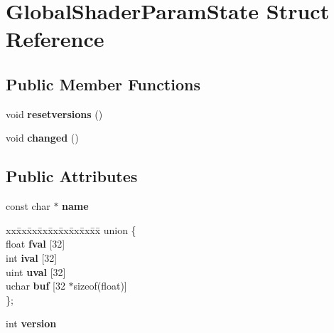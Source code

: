\hypertarget{struct_global_shader_param_state}{}\section{Global\+Shader\+Param\+State Struct Reference}
\label{struct_global_shader_param_state}
\subsection*{Public Member Functions}
\begin{DoxyCompactItemize}
\item 
\mbox{\label{struct_global_shader_param_state_ae241e9036d2ac52dc020baaab581c1eb}} 
void {\bfseries resetversions} ()
\item 
\mbox{\label{struct_global_shader_param_state_a1e33048f7eabf12de9d221d7fc432ebf}} 
void {\bfseries changed} ()
\end{DoxyCompactItemize}
\subsection*{Public Attributes}
\begin{DoxyCompactItemize}
\item 
\mbox{\label{struct_global_shader_param_state_a1a7f8e388002839da26481e52d7fcc9d}} 
const char $\ast$ {\bfseries name}
\item 
\mbox{\label{struct_global_shader_param_state_a3f8e306a7e12a40be73cf5d804fdc01a}} 
\begin{tabbing}
xx\=xx\=xx\=xx\=xx\=xx\=xx\=xx\=xx\=\kill
union \{\\
\>float {\bfseries fval} \mbox{[}32\mbox{]}\\
\>int {\bfseries ival} \mbox{[}32\mbox{]}\\
\>uint {\bfseries uval} \mbox{[}32\mbox{]}\\
\>uchar {\bfseries buf} \mbox{[}32 $\ast$sizeof(float)\mbox{]}\\
\}; \\

\end{tabbing}\item 
\mbox{\label{struct_global_shader_param_state_a1959e93d0a40b9a39ef1ca20de52f115}} 
int {\bfseries version}
\end{DoxyCompactItemize}
